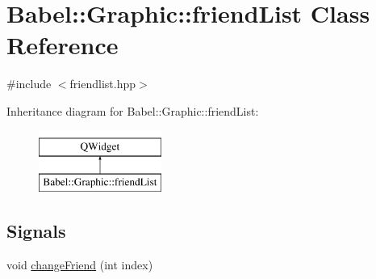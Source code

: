 \hypertarget{classBabel_1_1Graphic_1_1friendList}{}\section{Babel\+:\+:Graphic\+:\+:friend\+List Class Reference}
\label{classBabel_1_1Graphic_1_1friendList}


{\ttfamily \#include $<$friendlist.\+hpp$>$}

Inheritance diagram for Babel\+:\+:Graphic\+:\+:friend\+List\+:\begin{figure}[H]
\begin{center}
\leavevmode
\includegraphics[height=2.000000cm]{classBabel_1_1Graphic_1_1friendList}
\end{center}
\end{figure}
\subsection*{Signals}
\begin{DoxyCompactItemize}
\item 
void \hyperlink{classBabel_1_1Graphic_1_1friendList_a4fb26527c89a68a593feee755d1b8dad}{change\+Friend} (int index)
\end{DoxyCompactItemize}
